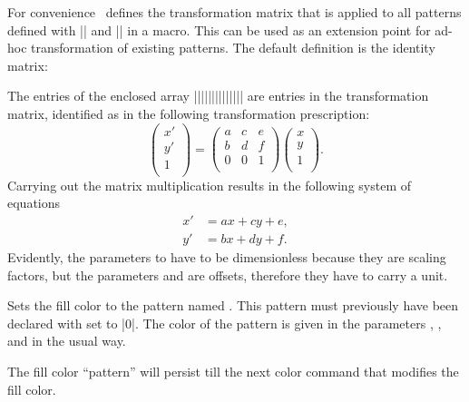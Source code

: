 \begin{command}{\pgfsys@patternmatrix}
    For convenience \pgfname\ defines the transformation matrix that is applied
    to all patterns defined with |\pgfdeclarepatternformonly| and
    |\pgfdeclarepatterninherentlycolored| in a macro.  This can be used as an
    extension point for ad-hoc transformation of existing patterns.  The
    default definition is the
    identity matrix:
\begin{codeexample}
\def\pgfsys@patternmatrix{{1.0}{0.0}{0.0}{1.0}{0.0pt}{0.0pt}}
\end{codeexample}
    The entries of the enclosed array
    |{||}{||}{||}{||}{||}{||}|
    are entries in the transformation matrix, identified as in the following
    transformation prescription:
    \begin{equation*}
        \begin{pmatrix}
            x' \\
            y' \\
            1 \\
        \end{pmatrix}
        =
        \begin{pmatrix}
            a & c & e \\
            b & d & f \\
            0 & 0 & 1 \\
        \end{pmatrix}
        \begin{pmatrix}
            x \\
            y \\
            1 \\
        \end{pmatrix} .
    \end{equation*}
    Carrying out the matrix multiplication results in the following system of
    equations
    \begin{align*}
        x' &= a x + c y + e , \\
        y' &= b x + d y + f .
    \end{align*}
    Evidently, the parameters  to  have to be dimensionless
    because they are scaling factors, but the parameters  and
     are offsets, therefore they have to carry a unit.
\end{command}

\begin{command}{\pgfsys@setpatternuncolored{}}
    Sets the fill color to the pattern named . This pattern must
    previously have been declared with  set to |0|. The color of the
    pattern is given in the parameters , , and
     in the usual way.

    The fill color ``pattern'' will persist till the next color command that
    modifies the fill color.
\end{command}

